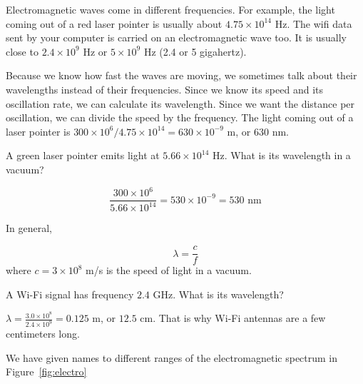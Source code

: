 Electromagnetic waves come in different frequencies. For example, the
light coming out of a red laser pointer is usually about $4.75 \times
10^{14}$ Hz.  The wifi data sent by your computer is carried on an
electromagnetic wave too. It is usually close to $2.4 \times 10^9$ Hz
or $5 \times 10^9$ Hz (2.4 or 5 gigahertz).

Because we know how fast the waves are moving, we sometimes talk about
their wavelengths instead of their frequencies.  Since we know its speed
and its oscillation rate, we can calculate its wavelength. Since we want 
the distance per oscillation, we can divide the speed by the frequency. The light coming out
of a laser pointer is $300 \times 10^6 / 4.75 \times 10^{14} = 630
\times 10^{-9}$ m, or 630 nm.

\begin{Exercise}[title={Wavelengths}, label=wave_length_green]

  A green laser pointer emits light at $5.66 \times
10^{14}$ Hz. What is its wavelength in a vacuum?
  
\end{Exercise}
\begin{Answer}[ref=wave_length_green]
$$\frac{300 \times 10^6}{5.66 \times 10^{14}} = 530 \times 10^{-9} = 530\text{ nm}$$
\end{Answer}

In general,

$$\lambda = \frac{c}{f}$$
where $c = 3 \times 10^8$ m/s is the speed of light in a vacuum.

\begin{Worked}
\begin{Problem}
A Wi-Fi signal has frequency $2.4$ GHz. What is its
wavelength?
\end{Problem}
\begin{Solution}
$\lambda = \frac{3.0 \times 10^8}{2.4 \times 10^9} = 0.125$ m,
or $12.5$ cm. That is why Wi-Fi antennas are a few centimeters long.
\end{Solution}
\end{Worked}

We have given names to different ranges of the electromagnetic spectrum in Figure~\ref{fig:electro}

